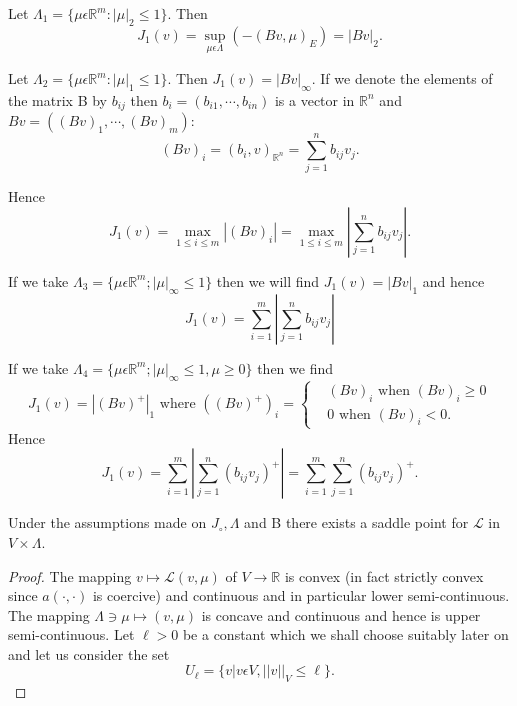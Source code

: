 \begin{example}\label{chap5-exam4.1}
Let $\Lambda_{1} = \{\mu \epsilon \mathbb{R}^{m}: |\mu|_{2} \leq 1 \}$. Then 
$$
J_{1} (v) = \sup_{\mu \epsilon \Lambda} (-(Bv, \mu)_{E}) = |Bv|_{2}.
$$
\end{example}

\begin{example}\label{chap5-exam4.2}
Let $\Lambda_{2} = \{\mu \epsilon \mathbb{R}^{m} : |\mu|_{1} \leq 1 \}$. Then $J_{1} (v) = |Bv|_{\infty}$. If we denote the elements of the matrix B by $b_{ij}$ then $b_{i} = (b_{i1}, \cdots , b_{in})$ is a vector in $\mathbb{R}^{n}$ and $Bv = ((Bv)_{1}, \cdots , (Bv)_{m})$:
$$
(Bv)_{i} = (b_{i}, v)_{\mathbb{R}^{n}} = \sum\limits_{j=1}^{n} b_{ij} v_{j}.
$$

Hence
$$
J_{1}(v) = \max_{1 \leq i \leq m} |(Bv)_{i}| = \max_{1 \leq i \leq m} |\sum\limits_{j=1}^{n} b_{ij} v_{j}|.
$$
\end{example}

\begin{example}\label{chap5-exam4.3}
If we take $\Lambda_{3} = \{\mu \epsilon \mathbb{R}^{m} ; |\mu|_{\infty} \leq 1 \}$ then we will find $J_{1}(v) = |Bv|_{1}$ and hence
$$
J_{1}(v) = \sum\limits_{i=1}^{m} |\sum\limits_{j=1}^{n} b_{ij} v_{j}|
$$
\end{example}

\begin{example}\label{chap5-exam4.4}
If we take $\Lambda_{4} = \{\mu \epsilon \mathbb{R}^{m} ; |\mu|_{\infty} \leq 1, \mu \geq 0 \}$ then we find
\begin{equation*}
J_{1} (v) = |(Bv)^{+}|_{1} \text{ where } ((Bv)^{+})_i =
\begin{cases}
& (Bv)_{i} \text{ when } (Bv)_{i} \geq 0\\
& 0 \text{ when } (Bv)_{i} < 0.
\end{cases}
\end{equation*}
Hence
$$
J_{1} (v) = \sum\limits_{i=1}^{m} |\sum\limits_{j=1}^{n} (b_{ij} v_{j})^{+}| = \sum_{i=1}^{m} \sum_{j=1}^{n} (b_{ij} v_{j})^{+}.
$$\pageoriginale
\end{example}

\begin{proposition}\label{chap5-prop4.1}
Under the assumptions made on $J_{\circ}, \Lambda$ and B there exists a saddle point for $\mathscr{L}$ in $V \times \Lambda$.
\end{proposition}

\begin{proof}
The mapping $v \mapsto \mathscr{L} (v, \mu)$ of $V \to \mathbb{R}$ is convex (in fact strictly convex since $a(\cdot , \cdot)$ is coercive) and continuous and in particular lower semi-continuous. The mapping $\Lambda \ni \mu \mapsto (v, \mu)$ is concave and continuous and hence is upper semi-continuous. Let $\ell > 0$ be a constant which we shall choose suitably later on and let us consider the set
$$
U_{\ell} = \{v | v \epsilon V, ||v||_{V} \leq \ell \}.
$$
\end{proof}


